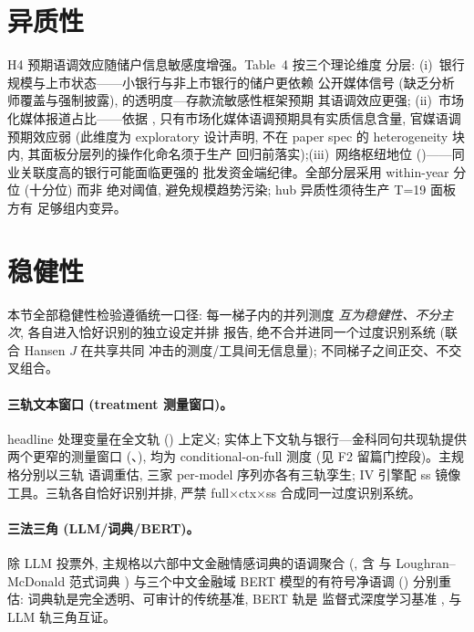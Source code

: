 \section{异质性}\label{sec:het}

H4 预期语调效应随储户信息敏感度增强。Table~4 按三个理论维度
分层: (i)~银行规模与上市状态——小银行与非上市银行的储户更依赖
公开媒体信号 (缺乏分析师覆盖与强制披露),
\textcite{chen2022transparency} 的透明度—存款流敏感性框架预期
其语调效应更强; (ii)~市场化媒体报道占比——依据
\textcite{you2018pen}, 只有市场化媒体语调预期具有实质信息含量,
官媒语调预期效应弱 (此维度为 exploratory 设计声明, 不在 paper
spec 的 heterogeneity 块内, 其面板分层列的操作化命名须于生产
回归前落实);(iii)~网络枢纽地位
()——同业关联度高的银行可能面临更强的
批发资金端纪律。全部分层采用 within-year 分位 (十分位) 而非
绝对阈值, 避免规模趋势污染; hub 异质性须待生产 T=19 面板方有
足够组内变异。

\section{稳健性}\label{sec:robust}

本节全部稳健性检验遵循统一口径: 每一梯子内的并列测度
\emph{互为稳健性、不分主次}, 各自进入恰好识别的独立设定并排
报告, 绝不合并进同一个过度识别系统 (联合 Hansen $J$ 在共享共同
冲击的测度/工具间无信息量); 不同梯子之间正交、不交叉组合。

\paragraph{三轨文本窗口 (treatment 测量窗口)。}
headline 处理变量在全文轨 () 上定义;
实体上下文轨与银行—金科同句共现轨提供两个更窄的测量窗口
(、), 均为
conditional-on-full 测度 (见 F2 留篇门控段)。主规格分别以三轨
语调重估, 三家 per-model 序列亦各有三轨孪生; IV 引擎配 ss 镜像
工具。三轨各自恰好识别并排, 严禁 full$\times$ctx$\times$ss
合成同一过度识别系统。

\paragraph{三法三角 (LLM/词典/BERT)。}
除 LLM 投票外, 主规格以六部中文金融情感词典的语调聚合
(, 含 \textcite{du2022dictionary} 与
Loughran--McDonald 范式词典 \parencite{loughran2011liability})
与三个中文金融域 BERT 模型的有符号净语调
()
分别重估: 词典轨是完全透明、可审计的传统基准, BERT 轨是
监督式深度学习基准 \parencite{huang2023finbert,
frankel2022disclosure}, 与 LLM 轨三角互证。

